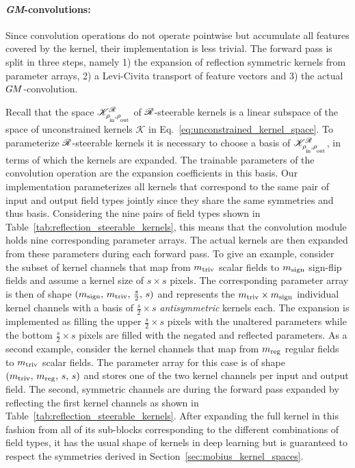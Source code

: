 \paragraph{\textit{GM}-convolutions:}
Since convolution operations do not operate pointwise but accumulate all features covered by the kernel, their implementation is less trivial.
The forward pass is split in three steps, namely
1) the expansion of reflection symmetric kernels from parameter arrays,
2) a Levi-Civita transport of feature vectors and
3) the actual $G\mkern-1.4muM$-convolution.

Recall that the space $\KR$ of $\mathscr{R}$-steerable kernels is a linear subspace of the space of unconstrained kernels $\mathscr{K}$ in Eq.~\eqref{eq:unconstrained_kernel_space}.
To parameterize $\mathscr{R}$-steerable kernels it is necessary to choose a basis of $\KR$, in terms of which the kernels are expanded.
The trainable parameters of the convolution operation are the expansion coefficients in this basis.
Our implementation parameterizes all kernels that correspond to the same pair of input and output field types jointly
since they share the same symmetries and thus basis.
Considering the nine pairs of field types shown in Table~\ref{tab:reflection_steerable_kernels}, this means that the convolution module holds nine corresponding parameter arrays.
The actual kernels are then expanded from these parameters during each forward pass.
To give an example, consider the subset of kernel channels that map from $m_{\textup{triv}}$ scalar fields to $m_{\textup{sign}}$ sign-flip fields and assume a kernel size of $s\times s$ pixels.
The corresponding parameter array is then of shape $(m_{\textup{sign}},\, m_{\textup{triv}},\, \frac{s}{2},\, s)$ and represents the $m_{\textup{triv}}\times m_{\textup{sign}}$ individual kernel channels with a basis of  $\frac{s}{2}\times s$ \emph{antisymmetric} kernels each.
The expansion is implemented as filling the upper $\frac{s}{2}\times s$ pixels with the unaltered parameters while the bottom $\frac{s}{2}\times s$ pixels are filled with the negated and reflected parameters.
As a second example, consider the kernel channels that map from $m_{\textup{reg}}$ regular fields to $m_{\textup{triv}}$ scalar fields.
The parameter array for this case is of shape $(m_{\textup{triv}},\, m_{\textup{reg}},\, s,\, s)$ and stores one of the two kernel channels per input and output field.
The second, symmetric channels are during the forward pass expanded by reflecting the first kernel channels as shown in Table~\ref{tab:reflection_steerable_kernels}.
After expanding the full kernel in this fashion from all of its sub-blocks corresponding to the different combinations of field types, it has the usual shape of kernels in deep learning but is guaranteed to respect the symmetries derived in Section~\ref{sec:mobius_kernel_spaces}.
